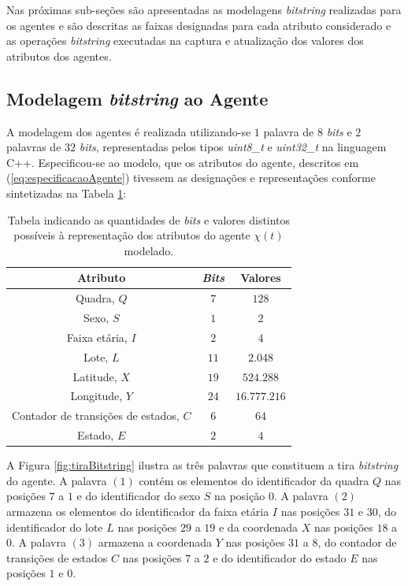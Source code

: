 Nas próximas sub-seções são apresentadas as modelagens \textit{bitstring} realizadas para os agentes e são descritas as faixas designadas para cada atributo considerado e as operações \textit{bitstring} executadas na captura e atualização dos valores dos atributos dos agentes.

\newpage

\subsection{Modelagem \textit{bitstring} ao Agente}

A modelagem dos agentes é realizada utilizando-se $1$ palavra de $8$ \textit{bits} e $2$ palavras de $32$ \textit{bits}, representadas pelos tipos \textit{uint8\_t} e \textit{uint32\_t} na linguagem C++. Especificou-se ao modelo, que os atributos do agente, descritos em (\ref{eq:especificacaoAgente}) tivessem as designações e representações conforme sintetizadas na Tabela \ref{tab:atributosBitstring}:
\begin{table}[H]
\centering
\begin{tabular}{c|c|c}
 \textbf{Atributo} 			& \textbf{\textit{Bits}}	& \textbf{Valores} 	\\ \hline
 Quadra, $Q$				& $7$				& $128$	  		\\
 Sexo, $S$ 				& $1$				& $2$	  		\\
 Faixa etária, $I$ 			& $2$				& $4$	  		\\
 Lote, $L$				& $11$				& $2.048$  		\\
 Latitude, $X$ 				& $19$				& $524.288$  		\\
 Longitude, $Y$ 			& $24$				& $16.777.216$ 		\\
 Contador de transições de estados, $C$ & $6$				& $64$	  		\\
 Estado, $E$	 			& $2$				& $4$	  		\\ 
 \end{tabular}
\caption{Tabela indicando as quantidades de \textit{bits} e valores distintos possíveis à representação dos atributos do agente $\chi(t)$ modelado.}
\label{tab:atributosBitstring}
\end{table}

A Figura \ref{fig:tiraBitstring} ilustra as três palavras que constituem a tira \textit{bitstring} do agente. A palavra $(1)$ contém os elementos do identificador da quadra $Q$ nas posições $7$ a $1$ e do identificador do sexo $S$ na posição $0$. A palavra $(2)$ armazena os elementos do identificador da faixa etária $I$ nas posições $31$ e $30$, do identificador do lote $L$ nas posições $29$ a $19$ e da coordenada $X$ nas posições $18$ a $0$. A palavra $(3)$ armazena a coordenada $Y$ nas posições $31$ a $8$, do contador de transições de estados $C$ nas posições $7$ a $2$ e do identificador do estado $E$ nas posições $1$ e $0$.

